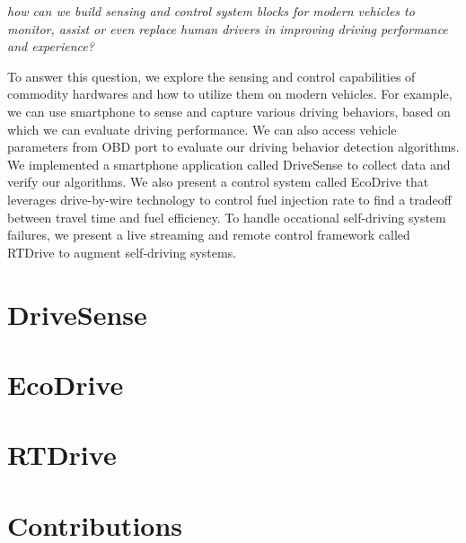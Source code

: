 \emph{how can we build sensing and control system blocks for modern vehicles to
monitor, assist or even replace human drivers in
improving driving performance and experience?}


To answer this question, we explore the sensing and control capabilities
of commodity hardwares and how to utilize them on modern vehicles. 
For example, we can use smartphone to sense and capture 
various driving behaviors, 
based on which we can evaluate driving performance. 
We can also access vehicle parameters from OBD 
port \cite{obd} to evaluate our driving behavior detection algorithms. 
We implemented a smartphone application called DriveSense to collect
data and verify our algorithms. 
We also present a control system called EcoDrive that 
leverages drive-by-wire technology to control fuel injection
rate to find a tradeoff between travel time and fuel efficiency. 
To handle occational self-driving system failures, 
we present a live streaming and remote control framework
called RTDrive to augment self-driving systems. 


\section{DriveSense}




\section{EcoDrive}




\section{RTDrive}



\section{Contributions}


